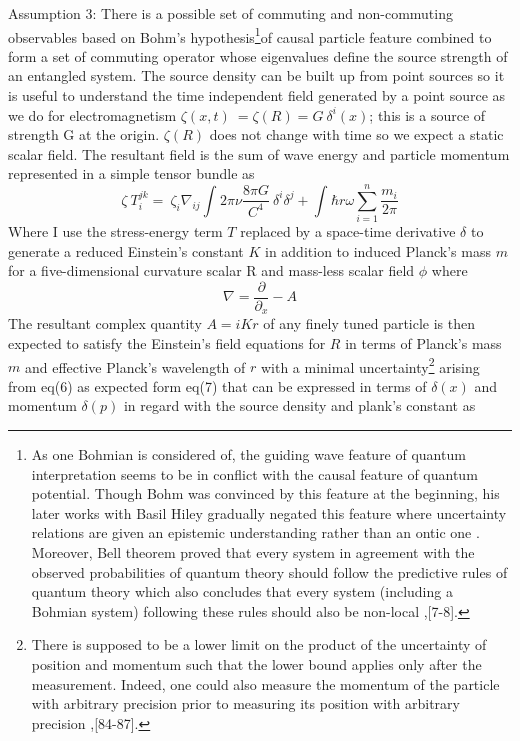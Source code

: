 \documentclass{article}
\begin{document}
Assumption 3: There is a possible set of commuting and non-commuting observables based on Bohm's hypothesis\footnote{As one Bohmian is considered of, the guiding wave feature of quantum interpretation seems to be in conflict with the causal feature of quantum potential. Though Bohm was convinced by this feature at the beginning, his later works with Basil Hiley gradually negated this feature where uncertainty relations are given an epistemic understanding rather than an ontic one \cite{9}. Moreover, Bell theorem proved that every system in agreement with the observed probabilities of quantum theory should follow the predictive rules of quantum theory which also concludes that every system (including a Bohmian system) following these rules should also be non-local \cite{10},[7-8].}of causal particle feature combined to form a set of commuting operator whose eigenvalues define the source strength of an entangled system. The source density can be built up from point sources so it is useful to understand the time independent field generated by a point source as we do for electromagnetism \begin{math}
 \zeta( x,t)\ =  \zeta( R) =  G \ \delta ^{i}(x) 
 \end{math}; this is a source of strength G at the origin. $\zeta(R)$ does not change with time so we expect a static scalar field. The resultant field is the sum of wave energy and particle momentum represented in a simple tensor bundle as
\begin{equation} 
\zeta~T_{i}^{jk}  =  ~\zeta_{i} \nabla _{ij} \int _{}^{}2 \pi  \nu  \frac{8 \pi G}{C^{4}}~ \delta ^{i} \delta ^{j}  +   \int _{}^{} \hbar r\omega\sum _{i=1}^{n}\frac{m_{i}}{2 \pi }
\end{equation} Where I use the stress-energy term $T$
replaced by a space-time derivative $\delta$ to generate a reduced  Einstein's constant $K$ in addition to induced Planck's mass $m$ for a five-dimensional curvature scalar R and mass-less scalar field $\phi$ where 
\begin{equation}
\nabla = \frac{\partial}{\partial_x}-A
\end{equation} The resultant complex quantity $A=iKr$ of any finely tuned particle is then expected to satisfy the  Einstein's field equations for $R$ in terms of Planck's mass $m$ and effective Planck's wavelength of $r$ with a minimal uncertainty\footnote{There is supposed to be a lower limit on the product of the uncertainty of position and momentum such that the lower bound applies only after the measurement. Indeed, one could also measure the momentum of the particle with arbitrary precision prior to measuring its position with arbitrary precision \cite{11},[84-87].} arising from eq(6) as expected form eq(7) that can be expressed in terms of $\delta (x)$ and momentum $\delta (p)$ in regard with the source density and plank's constant as
\end{document}
